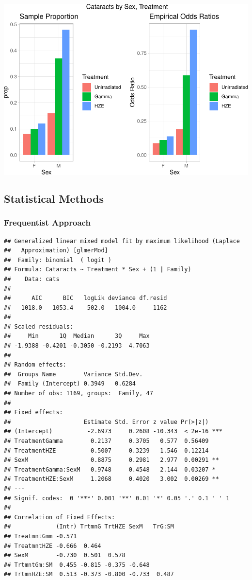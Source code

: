 \documentclass[
]{article}
\begin{document}
\includegraphics{final_report_files/figure-latex/barplot-1.pdf}

\hypertarget{statistical-methods}{%
\subsection{Statistical Methods}\label{statistical-methods}}

\hypertarget{frequentist-approach}{%
\subsubsection{Frequentist Approach}\label{frequentist-approach}}

\begin{verbatim}
## Generalized linear mixed model fit by maximum likelihood (Laplace
##   Approximation) [glmerMod]
##  Family: binomial  ( logit )
## Formula: Cataracts ~ Treatment * Sex + (1 | Family)
##    Data: cats
## 
##      AIC      BIC   logLik deviance df.resid 
##   1018.0   1053.4   -502.0   1004.0     1162 
## 
## Scaled residuals: 
##     Min      1Q  Median      3Q     Max 
## -1.9388 -0.4201 -0.3050 -0.2193  4.7063 
## 
## Random effects:
##  Groups Name        Variance Std.Dev.
##  Family (Intercept) 0.3949   0.6284  
## Number of obs: 1169, groups:  Family, 47
## 
## Fixed effects:
##                     Estimate Std. Error z value Pr(>|z|)    
## (Intercept)          -2.6973     0.2608 -10.343  < 2e-16 ***
## TreatmentGamma        0.2137     0.3705   0.577  0.56409    
## TreatmentHZE          0.5007     0.3239   1.546  0.12214    
## SexM                  0.8875     0.2981   2.977  0.00291 ** 
## TreatmentGamma:SexM   0.9748     0.4548   2.144  0.03207 *  
## TreatmentHZE:SexM     1.2068     0.4020   3.002  0.00269 ** 
## ---
## Signif. codes:  0 '***' 0.001 '**' 0.01 '*' 0.05 '.' 0.1 ' ' 1
## 
## Correlation of Fixed Effects:
##             (Intr) TrtmnG TrtHZE SexM   TrG:SM
## TreatmntGmm -0.571                            
## TreatmntHZE -0.666  0.464                     
## SexM        -0.730  0.501  0.578              
## TrtmntGm:SM  0.455 -0.815 -0.375 -0.648       
## TrtmnHZE:SM  0.513 -0.373 -0.800 -0.733  0.487
\end{verbatim}
\end{document}
